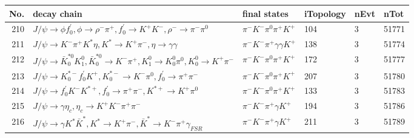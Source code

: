 \begin{table}[htbp] 
\begin{center}
\begin{small}
\begin{tabular}{rlllll}\hline\hline
 No. & decay chain & final states &  iTopology & nEvt & nTot \\\hline
210&$J/\psi       \rightarrow \phi           f^{'}_{0}     , \phi            \rightarrow \rho^{-}      \pi^{+}        , f^{'}_{0}      \rightarrow K^{+}          K^{-}          , \rho^{-}       \rightarrow \pi^{-}        \pi^{0}        $&$\pi^{-}        K^{-}          \pi^{0}        \pi^{+}        K^{+}          $&  104&    3&51771\\
211&$J/\psi       \rightarrow K^{-}          \pi^{+}        K^{*}          \eta          , K^{*}           \rightarrow K^{+}          \pi^{-}        , \eta           \rightarrow \gamma       \gamma       $&$\pi^{-}        K^{-}          \pi^{+}        \gamma       \gamma       K^{+}          $&  138&    3&51774\\
212&$J/\psi       \rightarrow \bar{K}_0^{*0}K_1^{0}        , \bar{K}_0^{*0} \rightarrow K^{-}          \pi^{+}        , K_1^{0}         \rightarrow K_0^{0}        \pi^{0}        , K_0^{0}         \rightarrow K^{+}          \pi^{-}        $&$\pi^{-}        K^{-}          \pi^{0}        \pi^{+}        K^{+}          $&  172&    3&51777\\
213&$J/\psi       \rightarrow K_{0}^{*-}     f^{'}_{0}     K^{+}          , K_{0}^{*-}      \rightarrow K^{-}          \pi^{0}        , f^{'}_{0}      \rightarrow \pi^{+}        \pi^{-}        $&$\pi^{-}        K^{-}          \pi^{0}        \pi^{+}        K^{+}          $&  207&    3&51780\\
214&$J/\psi       \rightarrow f^{'}_{0}     K^{-}          K^{*+}         , f^{'}_{0}      \rightarrow \pi^{+}        \pi^{-}        , K^{*+}          \rightarrow K^{+}          \pi^{0}        $&$\pi^{-}        K^{-}          \pi^{0}        \pi^{+}        K^{+}          $&  133&    3&51783\\
215&$J/\psi       \rightarrow \gamma       \eta_{c}    , \eta_{c}     \rightarrow K^{+}          K^{-}          \pi^{+}        \pi^{-}        $&$\pi^{-}        K^{-}          \pi^{+}        \gamma       K^{+}          $&  194&    3&51786\\
216&$J/\psi       \rightarrow \gamma       K^{*}          \bar{K}^{*}   , K^{*}           \rightarrow K^{+}          \pi^{-}        , \bar{K}^{*}    \rightarrow K^{-}          \pi^{+}        \gamma_{FSR} $&$\pi^{-}        K^{-}          \pi^{+}        \gamma       K^{+}          $&  211&    3&51789\\

\end{tabular}
\end{small}
\end{center}
\end{table}
